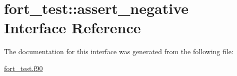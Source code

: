 \hypertarget{interfacefort__test_1_1assert__negative}{}\section{fort\+\_\+test\+:\+:assert\+\_\+negative Interface Reference}
\label{interfacefort__test_1_1assert__negative}


The documentation for this interface was generated from the following file\+:\begin{DoxyCompactItemize}
\item 
\hyperlink{fort__test_8f90}{fort\+\_\+test.\+f90}\end{DoxyCompactItemize}
